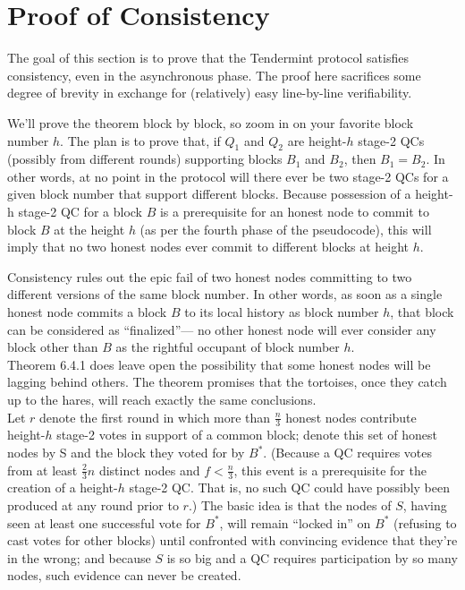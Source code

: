 \section{Proof of Consistency}
The goal of this section is to prove that the Tendermint protocol satisfies consistency, even
in the asynchronous phase. The proof here sacrifices some degree of brevity in exchange for
(relatively) easy line-by-line verifiability.
\begin{myproof}
We’ll prove the theorem block by block, so zoom in on your favorite
block number $h$. The plan is to prove that, if $Q_1$ and $Q_2$ are height-$h$ stage-2 QCs (possibly
from different rounds) supporting blocks $B_1$ and $B_2$, then $B_1 = B_2$. In other words, at
no point in the protocol will there ever be two stage-2 QCs for a given block number that
support different blocks. Because possession of a height-h stage-2 QC for a block $B$ is a
prerequisite for an honest node to commit to block $B$ at the height $h$ (as per the fourth
phase of the pseudocode), this will imply that no two honest nodes ever commit to different
blocks at height $h$.
\end{myproof}
Consistency rules out the epic fail of two honest nodes committing to two different versions of the same block number. In other words, as soon as a single honest node commits a
block $B$ to its local history as block number $h$, that block can be considered as “finalized”—
no other honest node will ever consider any block other than $B$ as the rightful occupant of
block number $h$.\\
Theorem 6.4.1 does leave open the possibility that some honest nodes will be lagging behind
others. The theorem promises that the tortoises, once they catch up to the hares, will reach
exactly the same conclusions.\\

Let $r$ denote the first round in which more than $\frac{n}{3}$ honest nodes contribute height-$h$
stage-2 votes in support of a common block; denote this set of honest nodes by S and the
block they voted for by $B^*$. (Because a QC requires votes from at least $\frac{2}{3}n$ distinct nodes
and $f < \frac{n}{3}$, this event is a prerequisite for the creation of a height-$h$ stage-2 QC. That
is, no such QC could have possibly been produced at any round prior to $r$.) The basic idea
is that the nodes of $S$, having seen at least one successful vote for $B^*$, will remain “locked in” on $B^*$ (refusing to cast votes for other blocks) until confronted with convincing evidence that they’re in the wrong; and because $S$ is so big and a QC requires participation by so
many nodes, such evidence can never be created.\\

